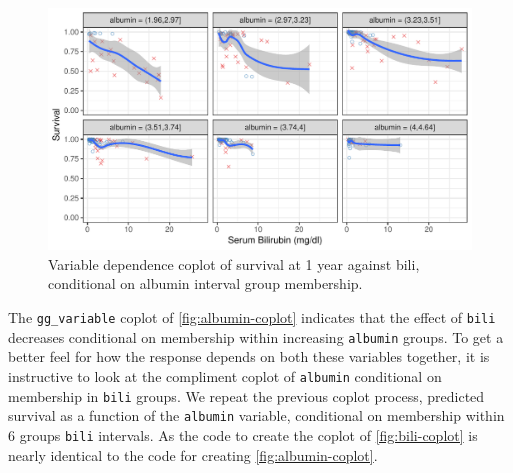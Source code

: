 \documentclass[article, nojss]{jss}
\begin{document}
\begin{Schunk}
\begin{figure}[!htb]

{\centering \includegraphics{rfs-albumin-coplot-1}

}

\caption[Variable dependence coplot of survival at 1 year against bili, conditional on albumin interval group membership]{Variable dependence coplot of survival at 1 year against bili, conditional on albumin interval group membership.}\label{fig:albumin-coplot}
\end{figure}
\end{Schunk}

The \texttt{gg\_variable} coplot of \autoref{fig:albumin-coplot}
indicates that the effect of \texttt{bili} decreases conditional on
membership within increasing \texttt{albumin} groups. To get a better
feel for how the response depends on both these variables together, it
is instructive to look at the compliment coplot of \texttt{albumin}
conditional on membership in \texttt{bili} groups. We repeat the
previous coplot process, predicted survival as a function of the
\texttt{albumin} variable, conditional on membership within 6 groups
\texttt{bili} intervals. As the code to create the coplot of
\autoref{fig:bili-coplot} is nearly identical to the code for creating
\autoref{fig:albumin-coplot}.
\end{document}
